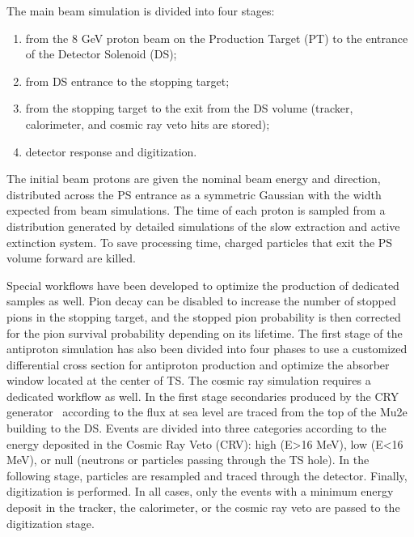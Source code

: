 The main beam simulation is divided into four stages:
\begin{enumerate}
\item from the 8 GeV proton beam on the Production Target (PT) to the entrance of the Detector Solenoid (DS);
\item from DS entrance to the stopping target;
\item from the stopping target to the exit from the DS volume (tracker, calorimeter, and cosmic ray veto hits are stored);
\item detector response and digitization.
\end{enumerate}

The initial beam protons are given the nominal beam energy and direction, distributed across the PS entrance as a symmetric Gaussian with the width expected from beam simulations. The time of each proton is sampled from a distribution generated by detailed simulations of the slow extraction and active extinction system. To save processing time, charged particles that exit the PS volume forward are killed.

Special workflows have been developed to optimize the production of dedicated samples as well. Pion decay can be disabled to increase the number of stopped pions in the stopping target, and the stopped pion probability is then corrected for the pion survival probability depending on its lifetime. The first stage of the antiproton simulation has also been divided into four phases to use a customized differential cross section for antiproton production and optimize the absorber window located at the center of TS. The cosmic ray simulation requires a dedicated workflow as well. In the first stage secondaries produced by the CRY generator~\cite{CRY:2007} according to the flux at sea level are traced from the top of the Mu2e building to the DS. Events are divided into three categories according to the energy deposited in the Cosmic Ray Veto (CRV): high (E>16 MeV), low (E<16 MeV), or null (neutrons or particles passing through the TS hole). In the following stage, particles are resampled and traced through the detector. Finally, digitization is performed. In all cases, only the events with a minimum energy deposit in the tracker, the calorimeter, or the cosmic ray veto are passed to the digitization stage.


